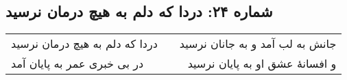\begin{center}
\section*{شماره ۲۴: دردا که دلم به هیچ درمان نرسید}
\label{sec:024}
\begin{longtable}{l p{0.5cm} r}
دردا که دلم به هیچ درمان نرسید
&&
جانش به لب آمد و به جانان نرسید
\\
در بی خبری عمر به پایان آمد
&&
و افسانهٔ عشق او به پایان نرسید
\\
\end{longtable}
\end{center}

